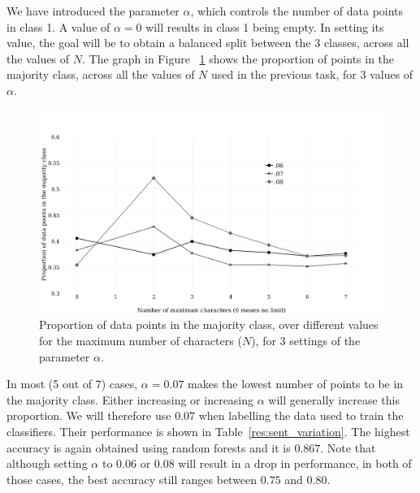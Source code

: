 \documentclass[bsc,frontabs,singlespacing,parskip]{infthesis} %
\begin{document}
We have introduced the parameter $\alpha$, which controls the number of data points in class 1. A value of $\alpha=0$ will results in class 1 being empty. In setting its value, the goal will be to obtain a balanced split between the 3 classes, across all the values of $N$. The graph in Figure ~\ref{fig:alpha} shows the proportion of points in the majority class, across all the values of $N$ used in the previous task, for 3 values of $\alpha$.

\begin{figure}[h!]
\begin{adjustwidth}{-0.7in}{-0.7in}
	\centering
	\includegraphics[scale=0.55]{figures/variation_alpha2}
	\caption{Proportion of data points in the majority class, over different values for the maximum number of characters ($N$), for 3 settings of the parameter $\alpha$.}
\label{fig:alpha}
\end{adjustwidth}
\end{figure}

In most (5 out of 7) cases, $\alpha=0.07$ makes the lowest number of points to be in the majority class. Either increasing or increasing $\alpha$ will generally increase this proportion. We will therefore use $0.07$ when labelling the data used to train the classifiers. Their performance is shown in Table~\ref{res:sent_variation}. The highest accuracy is again obtained using random forests and it is $0.867$. Note that although setting $\alpha$ to $0.06$ or $0.08$ will result in a drop in performance,  in both of those cases, the best accuracy still ranges between $0.75$ and $0.80$.
\end{document}
